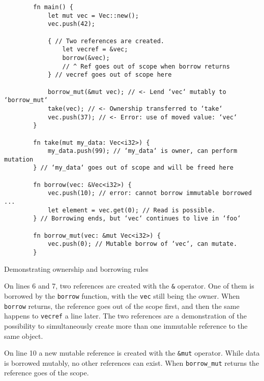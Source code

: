\begin{listing}[!ht]

    \centering
    \begin{verbatim}
        fn main() {
            let mut vec = Vec::new();
            vec.push(42);

            { // Two references are created.
                let vecref = &vec;
                borrow(&vec);
                // ^ Ref goes out of scope when borrow returns
            } // vecref goes out of scope here

            borrow_mut(&mut vec); // <- Lend ‘vec‘ mutably to ‘borrow_mut‘
            take(vec); // <- Ownership transferred to ‘take‘
            vec.push(37); // <- Error: use of moved value: ‘vec‘
        }

        fn take(mut my_data: Vec<i32>) {
            my_data.push(99); // ‘my_data‘ is owner, can perform mutation
        } // ‘my_data‘ goes out of scope and will be freed here

        fn borrow(vec: &Vec<i32>) {
            vec.push(10); // error: cannot borrow immutable borrowed ...
            let element = vec.get(0); // Read is possible.
        } // Borrowing ends, but ‘vec‘ continues to live in ‘foo‘

        fn borrow_mut(vec: &mut Vec<i32>) {
            vec.push(0); // Mutable borrow of ‘vec‘, can mutate.
        }
    \end{verbatim}

    \caption{Demonstrating ownership and borrowing rules}
    \label{lst:ownership-and-borrowing}
\end{listing}

On lines 6 and 7, two references are created with the \texttt{&} operator. One of them is borrowed by the \texttt{borrow} function, with the \texttt{vec} still being the owner. When \texttt{borrow} returns, the reference goes out of the scope first, and then the same happens to \texttt{vecref} a line later. The two references are a demonstration of the possibility to simultaneously create more than one immutable reference to the same object.

On line 10 a new mutable reference is created with the \texttt{&mut} operator. While data is borrowed mutably, no other references can exist. When \texttt{borrow_mut} returns the reference goes of the scope.

